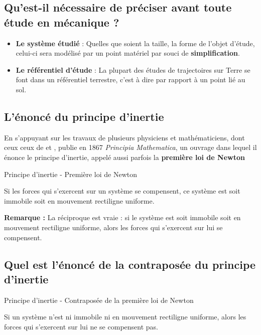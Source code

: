\documentclass[french, a4paper, 12pt, twocolumn, landscape]{article}
\begin{document}
\subsection{Qu'est-il nécessaire de préciser avant toute étude en mécanique ?}
\begin{itemize}
	\item \textbf{Le système étudié} : Quelles que soient la taille, la forme de l'objet d'étude, celui-ci sera modélisé par un point matériel par souci de \textbf{simplification}.\bigskip
	
	\item \textbf{Le référentiel d'étude} : La plupart des études de trajectoires sur Terre se font dans un référentiel terrestre, c'est à dire par rapport à un point lié au sol.
\end{itemize}

\subsection{L'énoncé du principe d'inertie}

En s'appuyant sur les travaux de plusieurs physiciens et mathématiciens, dont ceux ceux de  et ,  publie en 1867 \textit{Principia Mathematica}, un ouvrage dans lequel il énonce le principe d'inertie, appelé aussi parfois la \og \textbf{première loi de Newton} \fg

\begin{Proposition}{Principe d'inertie - Première loi de Newton}
	\medskip

	Si les forces qui s'exercent sur un système se compensent, ce système est soit immobile soit en mouvement rectiligne uniforme.
\end{Proposition}

\textbf{Remarque : } La réciproque est vraie : si le système est soit immobile soit en mouvement rectiligne uniforme, alors les forces qui s'exercent sur lui se compensent. 
\subsection{Quel est l'énoncé de la contraposée du principe d'inertie}

\begin{Proposition}{Principe d'inertie - Contraposée de la première loi de Newton}
	\medskip

	Si un système n'est ni immobile ni en mouvement rectiligne uniforme, alors les forces qui s'exercent sur lui ne se compensent pas.\medskip 
\end{Proposition}
\end{document}
